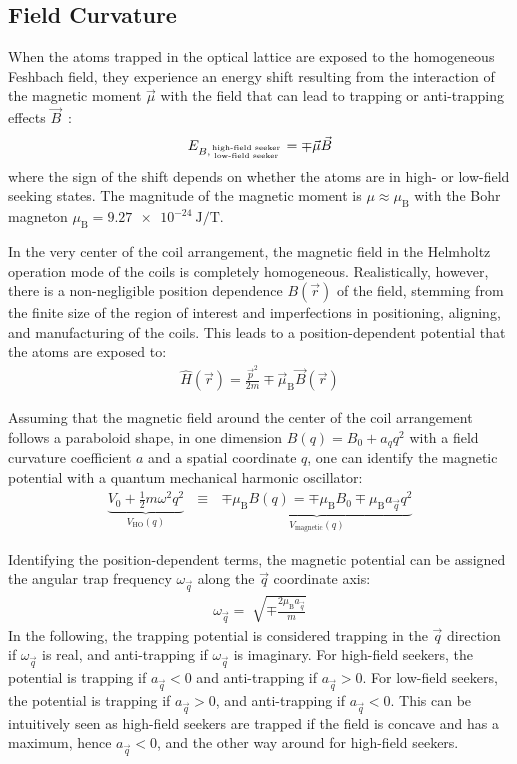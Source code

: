 \subsection*{Field Curvature}\label{ch:field_curvature_definition}
When the atoms trapped in the optical lattice are exposed to the homogeneous Feshbach field, they experience an energy shift resulting from the interaction of the magnetic moment $\vec \mu$ with the field that can lead to trapping or anti-trapping effects $\vec B$~\cite{pritchard_cooling_1983,gehm_properties_2003, hagemann_setup_2020}:
\begin{align}
    E_{B, {\text{high-field seeker} \atop \text{low-field seeker}}} = \mp \vec \mu \vec B
\end{align}
where the sign of the shift depends on whether the atoms are in high- or low-field seeking states. The magnitude of the magnetic moment is $\mu \approx \mu_\text{B}$ with the Bohr magneton $\mu_\text{B} = \SI{9.27e-24}{\joule\per\tesla}$.

In the very center of the coil arrangement, the magnetic field in the Helmholtz operation mode of the coils is completely homogeneous. Realistically, however, there is a non-negligible position dependence $B(\vec r)$ of the field, stemming from the finite size of the region of interest and imperfections in positioning, aligning, and manufacturing of the coils. This leads to a position-dependent potential that the atoms are exposed to:
\begin{align}
    \hat H(\vec r) = \frac{\vec p^2}{2m} \mp \vec \mu_\text{B} \vec B(\vec r)
\end{align}

Assuming that the magnetic field around the center of the coil arrangement follows a paraboloid shape, in one dimension $B(q) = B_0 + a_q q^2$ with a field curvature coefficient $a$ and a spatial coordinate $q$, one can identify the magnetic potential with a quantum mechanical harmonic oscillator:
\begin{align}
    \underbrace{V_0 + \frac{1}{2}m\omega^2q^2}_{V_\text{HO}(q)} ~~~\equiv~~~ \underbrace{\mp \mu_\text{B} B(q) = \mp \mu_\text{B} B_0 \mp \mu_\text{B} a_{\vec q} q^2}_{V_\text{magnetic}(q)}
\end{align}

Identifying the position-dependent terms, the magnetic potential can be assigned the angular trap frequency $\omega_{\vec q}$ along the $\vec q$ coordinate axis:
\begin{align}\label{eq:trap_omega_definition}
    \omega_{\vec q} = \sqrt[]{\mp\frac{2 \mu_\text{B} a_{\vec q}}{m}}
\end{align}
In the following, the trapping potential is considered trapping in the ${\vec q}$ direction if $\omega_{\vec q}$ is real, and anti-trapping if $\omega_{\vec q}$ is imaginary. For high-field seekers, the potential is trapping if $a_{\vec q} < 0$ and anti-trapping if $a_{\vec q} > 0$. For low-field seekers, the potential is trapping if $a_{\vec q} > 0$, and anti-trapping if $a_{\vec q} < 0$. This can be intuitively seen as high-field seekers are trapped if the field is concave and has a maximum, hence $a_{\vec q} < 0$, and the other way around for high-field seekers.

